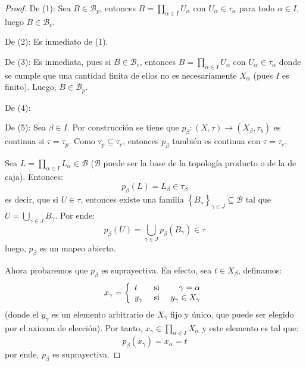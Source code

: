 \documentclass[12pt]{report}
\theoremstyle{largebreak}
\newcommand\cf[3]{\ensuremath{#1:#2\rightarrow#3}}
\begin{document}
    \begin{proof}
        De (1): Sea $B\in\mathcal{B}_p$, entonces $B=\prod_{\alpha\in I}U_\alpha$ con $U_\alpha\in\tau_\alpha$ para todo $\alpha\in I$, luego $B\in\mathcal{B}_c$.

        De (2): Es inmediato de (1).

        De (3): Es inmediata, pues si $B\in\mathcal{B}_c$, entonces $B=\prod_{\alpha\in I}U_\alpha$ con $U_\alpha\in\tau_\alpha$ donde se cumple que una cantidad finita de ellos no es necesariamente $X_\alpha$ (pues $I$ es finito). Luego, $B\in\mathcal{B}_p$.

        De (4): 

        De (5): Sea $\beta\in I$. Por construcción se tiene que $\cf{p_\beta}{(X,\tau)}{(X_\beta,\tau_b)}$ es continua si $\tau=\tau_p$. Como $\tau_p\subseteq\tau_c$, entonces $p_\beta$ también es continua con $\tau=\tau_c$.

        Sea $L=\prod_{\alpha\in I}L_\alpha\in\mathcal{B}$ ($\mathcal{B}$ puede ser la base de la topología producto o de la de caja). Entonces:
        \begin{equation}
            p_\beta(L)=L_\beta\in\tau_\beta
        \end{equation}
        es decir, que si $U\in\tau$, entonces existe una familia $\left\{B_\gamma \right\}_{\gamma\in J}\subseteq\mathcal{B}$ tal que $U=\bigcup_{\gamma\in J}B_\gamma$. Por ende:
        \begin{equation*}
            p_{\beta}(U)=\bigcup_{\gamma\in J}p_\beta(B_\gamma)\in\tau
        \end{equation*}
        luego, $p_\beta$ es un mapeo abierto.

        Ahora probaremos que $p_\beta$ es suprayectiva. En efecto, sea $t\in X_\beta$, definamos:
        \begin{equation*}
            x_\gamma=\left\{
                \begin{array}{lcr}
                    t & \textup{ si } & \gamma=\alpha\\
                    y_\gamma & \textup{ si } & y_\gamma\in X_\gamma\\
                \end{array}
            \right.
        \end{equation*}
        (donde el $y_\gamma$ es un elemento arbitrario de $X_\gamma$ fijo y único, que puede ser elegido por el axioma de elección). Por tanto, $x_\gamma\in\prod_{\alpha\in I}X_\alpha$ y este elemento es tal que:
        \begin{equation*}
            p_\beta(x_\gamma)=x_\alpha=t
        \end{equation*}
        por ende, $p_\beta$ es suprayectiva.


\end{proof}
\end{document}
